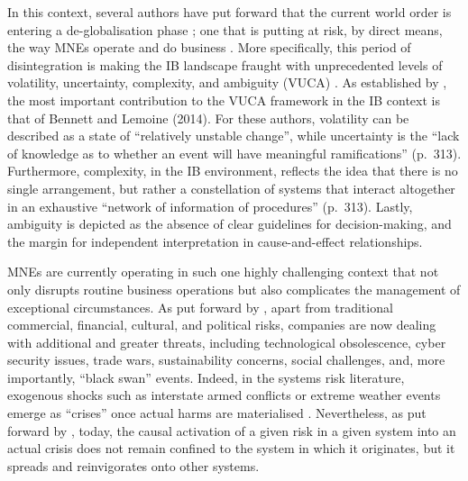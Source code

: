 \documentclass[12pt,a4paper]{article}
\begin{document}
In this context, several authors have put forward that the current world order is entering a de-globalisation phase \citep{livesey2018, james2018}; one that is putting at risk, by direct means, the way MNEs operate and do business \citep{petricevic2019}. More specifically, this period of disintegration is making the IB landscape fraught with unprecedented levels of volatility, uncertainty, complexity, and ambiguity (VUCA) \citep{bennett2014, cavusgil2021, schoemaker2018, tulder2020}. As established by \citet{senquiz-diaz2025}, the most important contribution to the VUCA framework in the IB context is that of Bennett and Lemoine (2014). For these authors, volatility can be described as a state of ``relatively unstable change'', while uncertainty is the ``lack of knowledge as to whether an event will have meaningful ramifications'' (p.\ 313). Furthermore, complexity, in the IB environment, reflects the idea that there is no single arrangement, but rather a constellation of systems that interact altogether in an exhaustive ``network of information of procedures'' (p.\ 313). Lastly, ambiguity is depicted as the absence of clear guidelines for decision-making, and the margin for independent interpretation in cause-and-effect relationships.

MNEs are currently operating in such one highly challenging context that not only disrupts routine business operations but also complicates the management of exceptional circumstances. As put forward by \citet{cavusgil2021}, apart from traditional commercial, financial, cultural, and political risks, companies are now dealing with additional and greater threats, including technological obsolescence, cyber security issues, trade wars, sustainability concerns, social challenges, and, more importantly, ``black swan'' events. Indeed, in the systems risk literature, exogenous shocks such as interstate armed conflicts or extreme weather events emerge as ``crises'' once actual harms are materialised \citep{homer-dixon2015}. Nevertheless, as put forward by \citet{lawrence2022polycrisis}, today, the causal activation of a given risk in a given system into an actual crisis does not remain confined to the system in which it originates, but it spreads and reinvigorates onto other systems.
\end{document}
